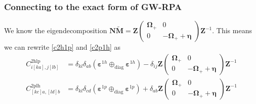 \subsubsection{Connecting to the exact form of GW-RPA}
We know the eigendecomposition $\bm{N}\tilde{\mathbf{M}}=\bm{Z}\begin{pmatrix} \bm{\Omega}_{+} & 0 \\ 0 & -\bm{\Omega}_{+} + \bm{\eta} \end{pmatrix}\bm{Z}^{-1}$. This means we can rewrite \ref{c2h1p} and \ref{c2p1h} as
\begin{align}
    {C}^{2 \mathrm{hlp}}_{i[ka],j[lb]} &= \delta_{kl}\delta_{ab}\left(\bm{\varepsilon}^{1h}\oplus_{\text{diag}} \bm{\varepsilon}^{1h}\right) -\delta_{ij} \bm{Z}\begin{pmatrix} \bm{\Omega}_{+} & 0 \\ 0 & -\bm{\Omega}_{+} + \bm{\eta} \end{pmatrix}\bm{Z}^{-1}\\
    {C}^{2 \mathrm{plh}}_{[kc]a,[ld]b} &= \delta_{kl}\delta_{cd}\left(\bm{\varepsilon}^{1p}\oplus_{\text{diag}} \bm{\varepsilon}^{1p}\right) +\delta_{ab} \bm{Z}\begin{pmatrix} \bm{\Omega}_{+} & 0 \\ 0 & -\bm{\Omega}_{+} + \bm{\eta} \end{pmatrix}\bm{Z}^{-1}
\end{align}
